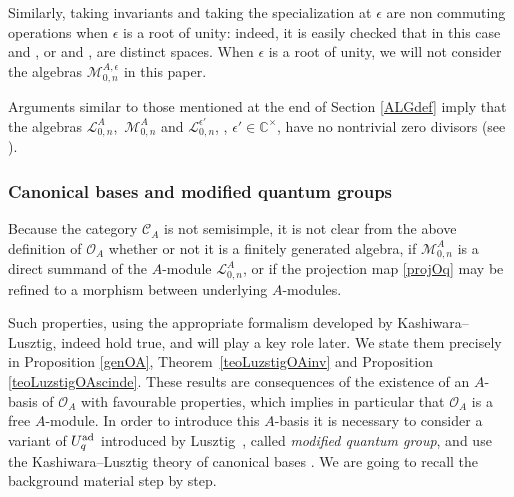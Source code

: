 \documentclass[pdftex]{sigma}
\numberwithin{equation}{section}
\theoremstyle{definition}
\newcommand{\e}{\epsilon}
\newcommand{\ep}{{\epsilon'}}
\newcommand{\mc}{\mathbb{C}}
\newcommand{\Ll}{{\mathcal L}}
\newcommand{\Mm}{{\mathcal M}}
\newcommand{\Oo}{{\mathcal O}}
\begin{document}
Similarly, taking invariants and taking the specialization at $\e$ are non commuting operations when $\e$ is a root of unity: indeed, it is easily checked that in this case \smash{$\big(U_A^{\otimes n}\big)^{U_A}_\e$} and \smash{$\big(U_\e^{\otimes n}\big)^{U_\e}$}, or \smash{$\Mm_{0,n}^{A,\e} = \Mm_{0,n}^A \bigotimes_A \mc_\e$} and \smash{$\big(\Ll_{0,n}^\e\big)^{U_\e}$}, are distinct spaces. When $\e$ is a root of unity, we will not consider the algebras $\Mm_{0,n}^{A,\e}$ in this paper.

Arguments similar to those mentioned at the end of Section \ref{ALGdef} imply that the algebras $\Ll_{0,n}^A$,~$\Mm_{0,n}^A$ and $\Ll_{0,n}^\ep$, \smash{$\Mm_{0,n}^{A,\ep}$}, $\ep\in \mc^\times$, have no nontrivial zero divisors (see \cite[Propositions~6.11 and~6.30]{BR}).

\subsubsection{Canonical bases and modified quantum groups} \label{canbasemodqg} Because the category $\mathcal{C}_A$ is not semisimple, it is not clear from the above definition of $\Oo_A$ whether or not it is a finitely generated algebra, if $\Mm_{0,n}^A$ is a direct summand of the $A$-module $\Ll_{0,n}^A$, or if the projection map \eqref{projOq} may be refined to a morphism between underlying $A$-modules.

Such properties, using the appropriate formalism developed by Kashiwara--Lusztig, indeed hold true, and will play a key role later. We state them precisely in Proposition \ref{genOA}, Theorem~\ref{teoLuzstigOAinv} and Proposition \ref{teoLuzstigOAscinde}. These results are consequences of the existence of an $A$-basis of $\Oo_A$ with favourable properties, which implies in particular that $\Oo_A$ is a free $A$-module. In order to introduce this $A$-basis it is necessary to consider a variant of $U_q^{\rm ad}$ introduced by Lusztig~\cite{Lusztig}, called {\it modified quantum group}, and use the Kashiwara--Lusztig theory of canonical bases \cite{Kashiwara1,Kashiwara2,Kashiwara3,Lusztig}. We are going to recall the background material step by step.
\end{document}
